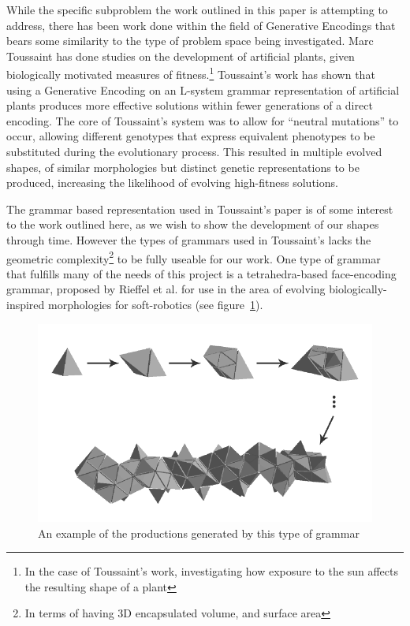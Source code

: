 \documentclass[condensed]{union-cs-thesis}
\begin{document}
\par
While the specific subproblem the work outlined in this paper is attempting to address, there has been work done within the field of Generative Encodings that bears some similarity to the type of problem space being investigated.  Marc Toussaint has done studies on the development of artificial plants, given biologically motivated measures of fitness\cite{toussaint2003demonstrating}.\footnote{In the case of Toussaint's work, investigating how exposure to the sun affects the resulting shape of a plant}  Toussaint's work has shown that using a Generative Encoding on an L-system grammar representation of artificial plants produces more effective solutions within fewer generations of a direct encoding.  The core of Toussaint's system was to allow for ``neutral mutations'' to occur, allowing different genotypes that express equivalent phenotypes to be substituted during the evolutionary process.  This resulted in multiple evolved shapes, of similar morphologies but distinct genetic representations to be produced, increasing the likelihood of evolving high-fitness solutions.

\par
The grammar based representation used in Toussaint's paper is of some interest to the work outlined here, as we wish to show the development of our shapes through time.  However the types of grammars used in Toussaint's lacks the geometric complexity\footnote{In terms of having 3D encapsulated volume, and surface area} to be fully useable for our work.  One type of grammar that fulfills many of the needs of this project is a tetrahedra-based face-encoding grammar, proposed by Rieffel et al. for use in the area of evolving biologically-inspired morphologies for soft-robotics \cite{Rieffel:face-grammar} (see figure~\ref{fig:tetra-blob}).
\begin{figure}[h]
  \centering
  \includegraphics[width=.75\textwidth]{johngrammar}
  \caption{An example of the productions generated by this type of grammar}
  \label{fig:tetra-blob}
\end{figure}
\end{document}
